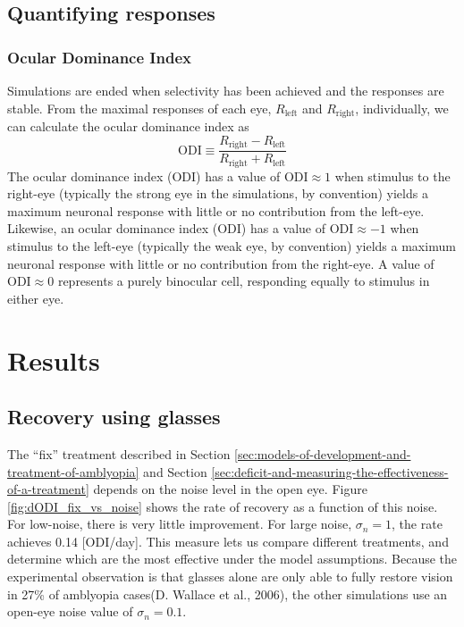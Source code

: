 \documentclass[
  onecolumn]{article}
\begin{document}
\hypertarget{quantifying-responses}{%
\subsection{Quantifying responses}\label{quantifying-responses}}

\hypertarget{ocular-dominance-index}{%
\subsubsection{Ocular Dominance Index}\label{ocular-dominance-index}}

Simulations are ended when selectivity has been achieved and the
responses are stable. From the maximal responses of each eye,
\(R_{\text{left}}\) and \(R_{\text{right}}\), individually, we can
calculate the ocular dominance index as \[
\text{ODI} \equiv \frac{R_{\text{right}}-R_{\text{left}}}{R_{\text{right}}+R_{\text{left}}}
\] The ocular dominance index (ODI) has a value of
\(\text{ODI} \approx 1\) when stimulus to the right-eye (typically the
strong eye in the simulations, by convention) yields a maximum neuronal
response with little or no contribution from the left-eye. Likewise, an
ocular dominance index (ODI) has a value of \(\text{ODI} \approx -1\)
when stimulus to the left-eye (typically the weak eye, by convention)
yields a maximum neuronal response with little or no contribution from
the right-eye. A value of \(\text{ODI} \approx 0\) represents a purely
binocular cell, responding equally to stimulus in either eye.

\hypertarget{results}{%
\section{Results}\label{results}}

\hypertarget{recovery-using-glasses}{%
\subsection{Recovery using glasses}\label{recovery-using-glasses}}

The ``fix'' treatment described in Section
\ref{sec:models-of-development-and-treatment-of-amblyopia} and Section
\ref{sec:deficit-and-measuring-the-effectiveness-of-a-treatment} depends
on the noise level in the open eye. Figure \ref{fig:dODI_fix_vs_noise}
shows the rate of recovery as a function of this noise. For low-noise,
there is very little improvement. For large noise, \(\sigma_n=1\), the
rate achieves 0.14 {[}ODI/day{]}. This measure lets us compare different
treatments, and determine which are the most effective under the model
assumptions. Because the experimental observation is that glasses alone
are only able to fully restore vision in 27\% of amblyopia cases(D.
Wallace et al., 2006), the other simulations use an open-eye noise value
of \(\sigma_n=0.1\).
\end{document}
